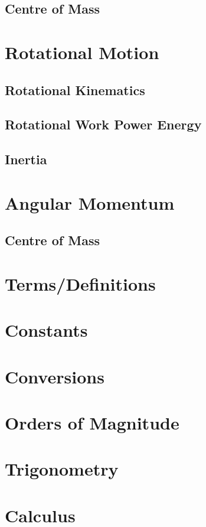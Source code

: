\documentclass[letterpaper]{article}
\begin{document}
\subsection{Centre of Mass}

\section{Rotational Motion}
\subsection{Rotational Kinematics}
\subsection{Rotational Work Power Energy}
\subsection{Inertia}

\section{Angular Momentum}
\subsection{Centre of Mass}

\appendix
\section{Terms/Definitions}

\section{Constants}

\section{Conversions}

\section{Orders of Magnitude}

\section{Trigonometry}

\section{Calculus}
\end{document}
